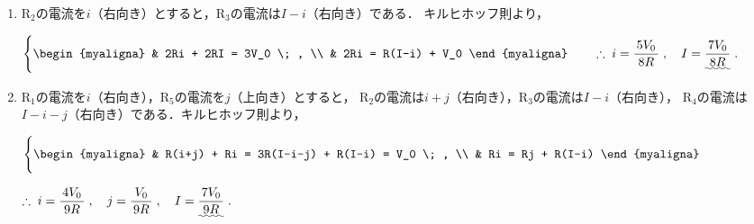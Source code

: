 \documentclass[../../../uem_phy_std_a.tex]{subfiles}
\begin{document}
    \begin{enumerate}
        \item $\mathrm{R}_2$の電流を$i$（右向き）とすると，$\mathrm{R}_3$の電流は$I-i$（右向き）である．%
            キルヒホッフ則より，
            
            \myspaceb%
            $\displaystyle%
                \Biggl\{
                    \begin{myaligna}
                        & 2Ri + 2RI = 3V_0 \; , \\
                        & 2Ri = R(I-i) + V_0
                    \end{myaligna}
                \qquad \therefore \; i = \myfracc{5V_0}{8R} \;,
                \quad I = \uwave{\myfracc{7V_0}{8R}} \;.
            $
        \item $\mathrm{R}_1$の電流を$i$（右向き），$\mathrm{R}_5$の電流を$j$（上向き）とすると，%
            $\mathrm{R}_2$の電流は$i+j$（右向き），$\mathrm{R}_3$の電流は$I-i$（右向き），%
            $\mathrm{R}_4$の電流は$I-i-j$（右向き）である．キルヒホッフ則より，
            
            \myspaceb%
            $\displaystyle%
                 \Biggl\{
                    \begin{myaligna}
                        & R(i+j) + Ri = 3R(I-i-j) + R(I-i) = V_0 \; , \\
                        & Ri = Rj + R(I-i)
                    \end{myaligna}
            $

            \myspaceb%
            $\displaystyle%
                \therefore \; i = \myfracc{4V_0}{9R} \;,
                \quad j = \myfracc{V_0}{9R} \;,
                \quad I = \uwave{\myfracc{7V_0}{9R}} \;.
            $        
    \end{enumerate}
\end{document}
